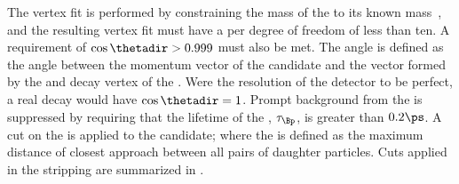The \Bp vertex fit is performed by constraining the mass of the \Ds to its known
mass~\cite{PDG2012}, and the resulting vertex fit must have a \chisqvtx per degree of freedom of
less than ten.
A requirement of $\cos\thetadir>0.999$ must also be met.
The angle \thetadir is defined as the angle between the momentum vector of the \Bp candidate and
the vector formed by the \pv and decay vertex of the \Bp.
Were the resolution of the \lhcb detector to be perfect, a real decay would have $\cos\thetadir=1$.
Prompt background from the \pv is suppressed by requiring that the lifetime of the \Bp,
$\tau_{\Bp}$, is greater than $0.2\ps$.
A cut on the \DOCA is applied to the \Ds candidate; where the \DOCA is defined as the maximum
distance of closest approach between all pairs of daughter particles.
Cuts applied in the stripping are summarized in .



